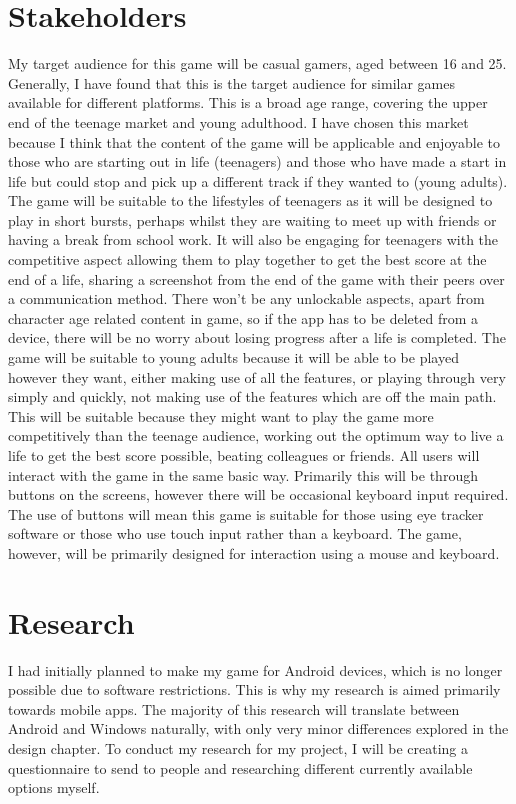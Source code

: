 \section{Stakeholders}
My target audience for this game will be casual gamers, aged between 16 and 25. Generally, I have found that this is the target audience for similar games available for different platforms. This is a broad age range, covering the upper end of the teenage market and young adulthood. I have chosen this market because I think that the content of the game will be applicable and enjoyable to those who are starting out in life (teenagers) and those who have made a start in life but could stop and pick up a different track if they wanted to (young adults). \newline
The game will be suitable to the lifestyles of teenagers as it will be designed to play in short bursts, perhaps whilst they are waiting to meet up with friends or having a break from school work. It will also be engaging for teenagers with the competitive aspect allowing them to play together to get the best score at the end of a life, sharing a screenshot from the end of the game with their peers over a communication method. There won’t be any unlockable aspects, apart from character age related content in game, so if the app has to be deleted from a device, there will be no worry about losing progress after a life is completed.\newline
The game will be suitable to young adults because it will be able to be played however they want, either making use of all the features, or playing through very simply and quickly, not making use of the features which are off the main path. This will be suitable because they might want to play the game more competitively than the teenage audience, working out the optimum way to live a life to get the best score possible, beating colleagues or friends. \newline
All users will interact with the game in the same basic way. Primarily this will be through buttons on the screens, however there will be occasional keyboard input required. The use of buttons will mean this game is suitable for those using eye tracker software or those who use touch input rather than a keyboard. The game, however, will be primarily designed for interaction using a mouse and keyboard.


\section{Research}
I had initially planned to make my game for Android devices, which is no longer possible due to software restrictions. This is why my research is aimed primarily towards mobile apps. The majority of this research will translate between Android and Windows naturally, with only very minor differences explored in the design chapter. \newline
To conduct my research for my project, I will be creating a questionnaire to send to people and researching different currently available options myself.

